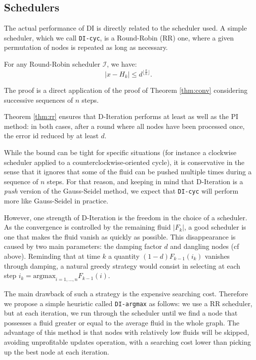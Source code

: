 \documentclass{llncs}
\begin{document}
\subsection{Schedulers}

The actual performance of DI is directly related to the scheduler used. A simple scheduler, which we call \texttt{DI-cyc}, is a Round-Robin (RR) one, where a given permutation of nodes is repeated as long as necessary.

\begin{theorem}
\label{thm:rr}
For any Round-Robin scheduler $\mathcal{I}$, we have: 
\begin{equation}\label{eq:rrconv}
|x - H_k| \leq  d^{\lfloor \frac k n \rfloor} \text{.}
\end{equation}

\end{theorem}

The proof is a direct application of the proof of Theorem \ref{thm:conv} considering successive sequences of $ n $ steps.


Theorem \ref{thm:rr} ensures that D-Iteration performs at least as well as the PI method: in both cases, after a round where all nodes have been processed once, the error id reduced by at least $ d $.

While the bound can be tight for specific situations (for instance a clockwise scheduler applied to a counterclockwise-oriented cycle), it is conservative in the sense that it ignores that some of the fluid can be pushed multiple times during a sequence of $ n $ steps. For that reason, and keeping in mind that D-Iteration is a \emph{push} version of the Gauss-Seidel method, we expect that  \texttt{DI-cyc} will perform more like Gauss-Seidel in practice.


However, one strength of D-Iteration is the freedom in the choice of a scheduler. As the convergence is controlled by the remaining fluid $|F_k|$, a good scheduler is one that makes the fluid vanish as quickly as possible. This disappearance is caused by two main parameters: the damping factor $d$ and dangling nodes (cf above). Reminding that at time $ k $ a quantity $(1-d)F_{k-1}(i_k)  $ vanishes through damping, a natural greedy strategy would consist in selecting at each step $ i_k =\textrm{argmax}_{i=1,\ldots,n}F_{k-1}(i)  $.

The main drawback of such a strategy is the expensive searching cost. Therefore we propose a simple heuristic called \texttt{DI-argmax} as follows: we use a RR scheduler, but at each iteration, we run through the scheduler until we find a node that possesses a fluid greater or equal to the average fluid in the whole graph. The advantage of this method is that nodes with relatively low fluids will be skipped, avoiding unprofitable updates operation, with a searching cost lower than picking up the best node at each iteration.
\end{document}
